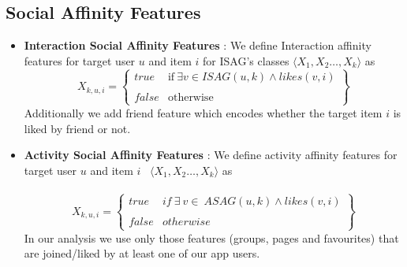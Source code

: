 \subsection{Social Affinity Features}
\label{ssec:SAfeature}

\begin{itemize}
  \item \textbf{Interaction Social Affinity Features} : We define Interaction affinity features for target user $u$ and item $i$ for ISAG's classes 
  $ \langle X_{1},X_{2}\ldots,X_{k}\rangle$ as
  \begin{equation*}
   X_{k,u,i} = \begin{Bmatrix}
   		\mathit{true} & \text{if}\ \exists v\in ISAG(u,k) \wedge likes(v,i)\\ \\
   		\mathit{false} & \text{otherwise}
   \end{Bmatrix}
  \end{equation*}
  Additionally we add friend feature which encodes whether the target item $i$ is liked by friend or not.
  \item \textbf{Activity Social Affinity Features} : We define activity affinity features for target user $u$ and item $i$   \
  $ \langle X_{1},X_{2}\ldots,X_{k}\rangle$ as\\ \\
  \begin{equation*}
   X_{k,u,i} = \begin{Bmatrix}
   		\mathit{true} & if\ \exists\ v\in \ ASAG(u,k) \wedge likes(v,i)\\ \\
   		\mathit{false} & otherwise
   \end{Bmatrix}
  \end{equation*}
	In our analysis we use only those features (groups, pages and favourites) that are joined/liked by at least one of our app users.
\end{itemize}

